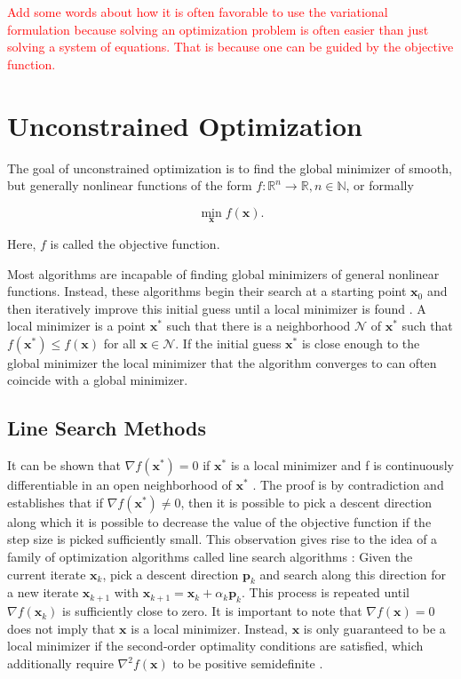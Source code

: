 \textcolor{red}{Add some words about how it is often favorable to use the variational formulation because solving an optimization problem is
often easier than just solving a system of equations. That is because one can be guided by the objective function.}

\section{Unconstrained Optimization}\label{s:unconstrained-optimization}
The goal of unconstrained optimization is to find the global minimizer of smooth, but generally nonlinear functions of the form $f \colon 
\mathbb{R}^n \to \mathbb{R}, n \in \mathbb{N}$, or formally

\[
    \min_{\bm{x}} f(\bm{x}).
\]

\noindent Here, $f$ is called the objective function. 

Most algorithms are incapable of finding global minimizers of general nonlinear functions. 
Instead, these algorithms begin their search at a starting point $\bm{x}_0$ and then iteratively improve this initial guess until a local 
minimizer is found \cite{nocedal2006}. A local minimizer is a point $\bm{x}^*$ such that there is a neighborhood $\mathcal{N}$ of 
$\bm{x}^*$ such that $f(\bm{x}^*) \leq f(\bm{x})$ for all $\bm{x} \in \mathcal{N}$. If the initial guess $\bm{x}^*$ is close enough 
to the global minimizer the local minimizer that the algorithm converges to can often coincide with a global minimizer. 

\subsection{Line Search Methods}\label{ss:line-search}
It can be shown that $\nabla f(\bm{x}^*) = 0$ if $\bm{x}^*$ is a local minimizer and f is continuously differentiable in an open neighborhood
of $\bm{x}^*$ \cite{nocedal2006}. The proof is by contradiction and establishes that if $\nabla f(\bm{x}^*) \neq 0$, then it is possible to pick a descent 
direction along which it is possible to decrease the value of the objective function if the step size is picked sufficiently small. This 
observation gives rise to the idea of a family of optimization algorithms called line search algorithms \cite{nocedal2006}: Given the current 
iterate $\bm{x}_k$, pick a descent direction $\bm{p}_k$ and search along this direction for a new iterate $\bm{x}_{k+1}$ with $\bm{x}_{k+1} = 
\bm{x}_k + \alpha_k \bm{p}_k$. This process is repeated until $\nabla f(\bm{x}_k)$ is sufficiently close to zero. It is important to note that 
$\nabla f(\bm{x}) = 0$ does not imply that $\bm{x}$ is a local minimizer. Instead, $\bm{x}$ is only guaranteed to be a local minimizer if 
the second-order 
optimality conditions are satisfied, which additionally require $\nabla^2 f(\bm{x})$ to be positive semidefinite \cite{nocedal2006}.

